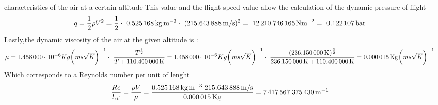 \documentclass[[12pt,twoside]{book}
\begin{document}
\begin{myExampleX}{characteristics of the air at a certain altitude}{}
This value and the flight speed value allow the calculation of the dynamic pressure of flight
\[
\bar{q}=\frac{1}{2} \rho V^{2} =\frac{1}{2}\cdot\ \SI[round-precision=3]{\myDensity}{kg~m^{-3}} \cdot\ (\SI[round-precision=2]{\mySpeedMs}{m/s})^{2} =~\SI[round-precision=2]{\myDynamicpressureNm}{N m^{-2}}=~\SI[round-precision=3]{\myDynamicpressureBar}{bar}
\]
Lastly,the dynamic viscosity of the air at the given  altitude is :
\[
\mu =  \SI[round-precision=3]{\myCone}{\cdot\ 10^{-6}}{Kg} \biggl({m s \sqrt{K} }\biggr)^{-1} \cdot\ \frac {T^{\frac{3}{2}}}{T+\SI[round-precision=1]{\myCtwo}{K}} =
 \SI[round-precision=3]{\myCone}{\cdot\ 10^{-6}}{Kg} \biggl({m s \sqrt{K} }\biggr)^{-1} \cdot\ \frac {(\SI[round-precision=3]{\myTemperatureK}{K})^{\frac{3}{2}}}{\SI[round-precision=3]{\myTemperatureK}{K}+\SI[round-precision=1]{\myCtwo}{K}} =\SI[round-precision=6]{\myDynamicviscosity }{Kg}{\biggl({m s \sqrt{K} }\biggr)^{-1}}
\]
Which corresponds to a Reynolds number per unit of lenght
\[
 \frac{ Re }{l_\text{rif} } =\frac{ \rho V}{\mu }=\frac{ \SI[round-precision=3]{\myDensity}{kg~m^{-3}}~ \SI[round-precision=2]{\mySpeedMs}{m/s}}{\SI[round-precision=6]{\myDynamicviscosity }{Kg} }  = \SI[round-precision=0]{\myReynoldsnumeberperunitoflenght}{m^{-1}}


\]

\end{myExampleX}
\end{document}
